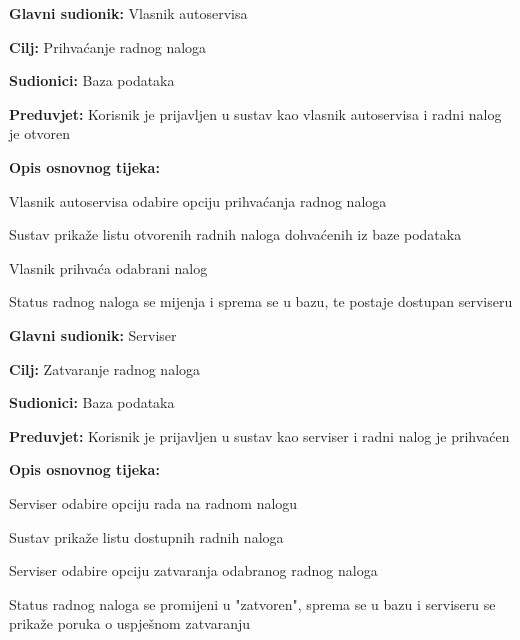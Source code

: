\noindent {}
\begin{packed_item}
	
	\item \textbf{Glavni sudionik: } Vlasnik autoservisa
	\item  \textbf{Cilj:} Prihvaćanje radnog naloga
	\item  \textbf{Sudionici:} Baza podataka
	\item  \textbf{Preduvjet:} Korisnik je prijavljen u sustav kao vlasnik autoservisa i radni nalog
	je otvoren
	\item  \textbf{Opis osnovnog tijeka:}
	
	\item[] \begin{packed_enum}
		
		\item Vlasnik autoservisa odabire opciju prihvaćanja radnog naloga
		\item Sustav prikaže listu otvorenih radnih naloga dohvaćenih iz baze podataka
		\item Vlasnik prihvaća odabrani nalog
		\item Status radnog naloga se mijenja i sprema se u bazu, te postaje dostupan serviseru
		
	\end{packed_enum}
\end{packed_item}

\noindent {}
\begin{packed_item}
	
	\item \textbf{Glavni sudionik: } Serviser
	\item  \textbf{Cilj:} Zatvaranje radnog naloga
	\item  \textbf{Sudionici:} Baza podataka
	\item  \textbf{Preduvjet:} Korisnik je prijavljen u sustav kao serviser i radni nalog
	je prihvaćen
	\item  \textbf{Opis osnovnog tijeka:}
	
	\item[] \begin{packed_enum}
		
		\item Serviser odabire opciju rada na radnom nalogu
		\item Sustav prikaže listu dostupnih radnih naloga
		\item Serviser odabire opciju zatvaranja odabranog radnog naloga
		\item Status radnog naloga se promijeni u "zatvoren", sprema se u bazu i serviseru se prikaže poruka o uspješnom zatvaranju
		
	\end{packed_enum}
\end{packed_item}


